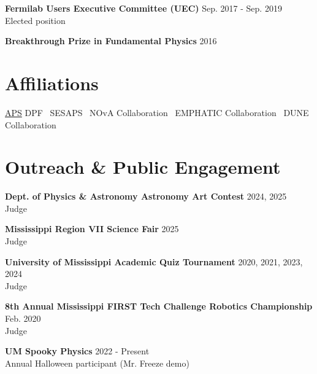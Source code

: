\documentclass[margin, line]{res}
\newcommand{\APS}{https://www.aps.org/}
\renewcommand{\em}{\upshape\sffamily}
\begin{document}
\begin{resume}
{\bf Fermilab Users Executive Committee (UEC)} \hfill {Sep. 2017 - Sep. 2019}\\
{\em Elected position}\\
\vspace{-.3cm}

{\bf Breakthrough Prize in Fundamental Physics} \hfill {2016}\\

\section{\sc Affiliations}
\href{\APS}{APS} DPF \textperiodcentered\ SESAPS \textperiodcentered\ NOvA Collaboration \textperiodcentered\ EMPHATIC Collaboration \textperiodcentered\ DUNE Collaboration
\vspace*{-0.3in}

\vspace{0.2in}

\section{\sc Outreach \& Public Engagement}

{\bf Dept. of Physics \& Astronomy Astronomy Art Contest} \hfill {2024, 2025}\\
{\em Judge}\\
\vspace{-.3cm}

{\bf Mississippi Region VII Science Fair} \hfill {2025}\\
{\em Judge}\\
\vspace{-.3cm}

{\bf University of Mississippi Academic Quiz Tournament} \hfill {2020, 2021, 2023, 2024}\\
{\em Judge}\\
\vspace{-.3cm}

{\bf 8th Annual Mississippi FIRST Tech Challenge Robotics Championship} \hfill {Feb. 2020}\\
{\em Judge}\\
\vspace{-.3cm}

{\bf UM Spooky Physics} \hfill {2022 - Present}\\
{\em Annual Halloween participant (Mr. Freeze demo)}\\
\vspace{-.3cm}


\end{resume}
\end{document}
